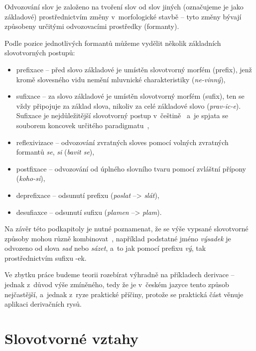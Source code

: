 Odvozování slov je založeno na tvoření slov od slov jiných (označujeme
je jako základové) prostřednictvím změny v~morfologické stavbě -- tyto
změny bývají způsobeny určitými odvozovacími prostředky (formanty).
\parencite[93]{dokulil00}

Podle pozice jednotlivých formantů můžeme vydělit několik základních
slovotvorných postupů:

\begin{itemize}
\tightlist
\item
  prefixace -- před slovo základové je umístěn slovotvorný morfém
  (prefix), jenž kromě slovesného vidu nemění mluvnické charakteristiky
  (\emph{ne-vinný}),
\item
  sufixace -- za slovo základové je umístěn slovotvorný morfém (sufix),
  ten se vždy připojuje za základ slova, nikoliv za celé základové slovo
  (\emph{prav-ic-e}). Sufixace je nejdůležitější slovotvorný postup
v~češtině~\parencite[23]{dokulil62} a~je spjata se souborem koncovek
  určitého paradigmatu~\parencite[93]{dokulil00},
\item
  reflexivizace -- odvozování zvratných sloves pomocí volných zvratných
  formantů \emph{se}, \emph{si} (\emph{bavit se}),
\item
  postfixace -- odvozování od úplného slovního tvaru pomocí zvláštní
  přípony (\emph{koho-si}),
\item
  deprefixace -- odsunutí prefixu (\emph{poslat} --\textgreater{}
  \emph{slát}),
\item
  desufiaxce -- odsunutí sufixu (\emph{plamen} --\textgreater{}
  \emph{plam}).~\parencite[93--94]{dokulil00}
\end{itemize}

Na závěr této podkapitoly je nutné poznamenat, že se výše vypsané
slovotvorné způsoby mohou různě kombinovat~\parencite[93]{dokulil00},
například podstatné jméno \emph{výsadek} je odvozeno od slova \emph{sad}
nebo \emph{sázet}, a~to jak pomocí prefixu \emph{vý}, tak
prostřednictvím sufixu -ek.

Ve zbytku práce budeme teorii rozebírat výhradně na příkladech derivace
-- jednak z~důvod výše zmíněného, tedy že je v~českém jazyce tento
způsob nejčastější, a~jednak z~ryze praktické příčiny, protože se
praktická část věnuje aplikaci derivačních rysů.

\hypertarget{slovotvornuxe9-vztahy}{%
\section{Slovotvorné vztahy}\label{slovotvornuxe9-vztahy}}

